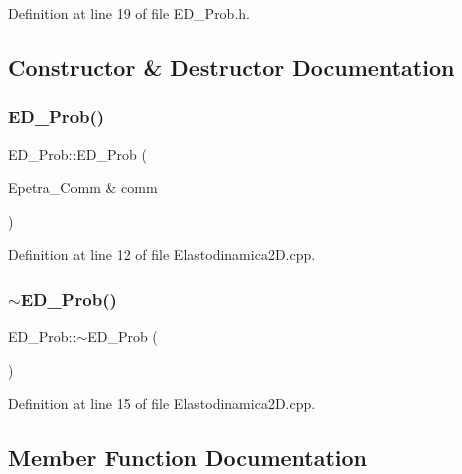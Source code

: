 Definition at line 19 of file E\+D\+\_\+\+Prob.\+h.



\subsection{Constructor \& Destructor Documentation}
\mbox{\label{classED__Prob_aaec17f928041e3205d2817d066b80246}} 
\subsubsection{\texorpdfstring{E\+D\+\_\+\+Prob()}{ED\_Prob()}}
{\footnotesize\ttfamily E\+D\+\_\+\+Prob\+::\+E\+D\+\_\+\+Prob (\begin{DoxyParamCaption}\item[{Epetra\+\_\+\+Comm \&}]{comm }\end{DoxyParamCaption})}



Definition at line 12 of file Elastodinamica2\+D.\+cpp.

\mbox{\label{classED__Prob_a5d319253f12aa320c70907af6ad19d7a}} 
\subsubsection{\texorpdfstring{$\sim$\+E\+D\+\_\+\+Prob()}{~ED\_Prob()}}
{\footnotesize\ttfamily E\+D\+\_\+\+Prob\+::$\sim$\+E\+D\+\_\+\+Prob (\begin{DoxyParamCaption}{ }\end{DoxyParamCaption})}



Definition at line 15 of file Elastodinamica2\+D.\+cpp.



\subsection{Member Function Documentation}
\mbox{\label{classGeProb_ab622a6354ec337bab6c2563049b0db4f}} 
